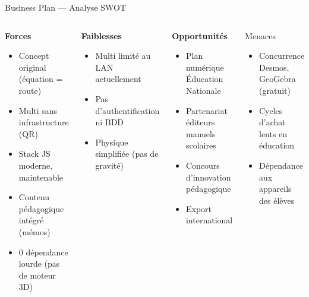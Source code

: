 \documentclass[aspectratio=169,12pt]{beamer}
\newcommand{\highlight}[1]{\textcolor{myyellow}{\textbf{#1}}}
\newcommand{\success}[1]{\textcolor{mygreen}{\textbf{#1}}}
\newcommand{\danger}[1]{\textcolor{myred}{\textbf{#1}}}
\begin{document}
\begin{frame}{Business Plan --- Analyse SWOT}
  \begin{columns}
    \begin{exampleblock}{\success{Forces}}
      \begin{itemize}
        \item Concept original (\'equation = route)
        \item Multi sans infrastructure (QR)
        \item Stack JS moderne, maintenable
        \item Contenu p\'edagogique int\'egr\'e (m\'emos)
        \item 0 d\'ependance lourde (pas de moteur 3D)
      \end{itemize}
    \end{exampleblock}
    \begin{alertblock}{\danger{Faiblesses}}
      \begin{itemize}
        \item Multi limit\'e au LAN actuellement
        \item Pas d'authentification ni BDD
        \item Physique simplifi\'ee (pas de gravit\'e)
      \end{itemize}
    \end{alertblock}
    \begin{block}{\highlight{Opportunit\'es}}
      \begin{itemize}
        \item Plan num\'erique \'Education Nationale
        \item Partenariat \'editeurs manuels scolaires
        \item Concours d'innovation p\'edagogique
        \item Export international
      \end{itemize}
    \end{block}
    \begin{block}{\textcolor{mylightslate}{Menaces}}
      \begin{itemize}
        \item Concurrence Desmos, GeoGebra (gratuit)
        \item Cycles d'achat lents en \'education
        \item D\'ependance aux appareils des \'el\`eves
      \end{itemize}
    \end{block}
  \end{columns}
\end{frame}
\end{document}
